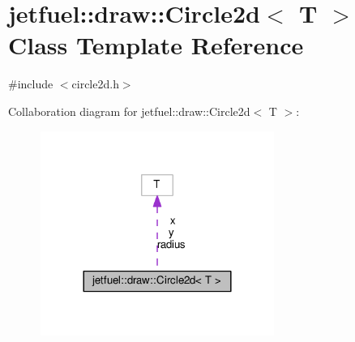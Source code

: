 \hypertarget{classjetfuel_1_1draw_1_1Circle2d}{}\section{jetfuel\+:\+:draw\+:\+:Circle2d$<$ T $>$ Class Template Reference}
\label{classjetfuel_1_1draw_1_1Circle2d}


{\ttfamily \#include $<$circle2d.\+h$>$}



Collaboration diagram for jetfuel\+:\+:draw\+:\+:Circle2d$<$ T $>$\+:\nopagebreak
\begin{figure}[H]
\begin{center}
\leavevmode
\includegraphics[width=216pt]{classjetfuel_1_1draw_1_1Circle2d__coll__graph}
\end{center}
\end{figure}
